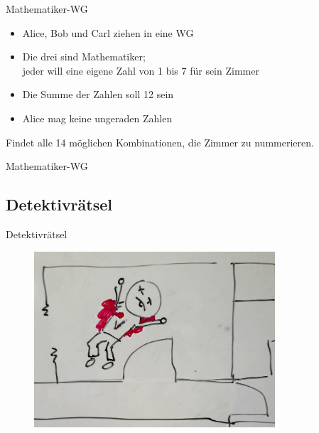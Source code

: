 \documentclass{beamer}
\begin{document}
\begin{frame}{Mathematiker-WG}
	\begin{itemize}
		\item Alice, Bob und Carl ziehen in eine WG
		\item Die drei sind Mathematiker;\\jeder will eine eigene Zahl von 1 bis 7 für sein Zimmer
		\item Die Summe der Zahlen soll 12 sein
		\item Alice mag keine ungeraden Zahlen
	\end{itemize}

	Findet alle 14 möglichen Kombinationen, die Zimmer zu nummerieren.
\end{frame}

\begin{frame}{Mathematiker-WG}
\end{frame}

\subsection{Detektivrätsel}

\begin{frame}{Detektivrätsel}
	\begin{figure}
		\includegraphics[width=0.8\textwidth]{images/victor}
	\end{figure}
\end{frame}
\end{document}
